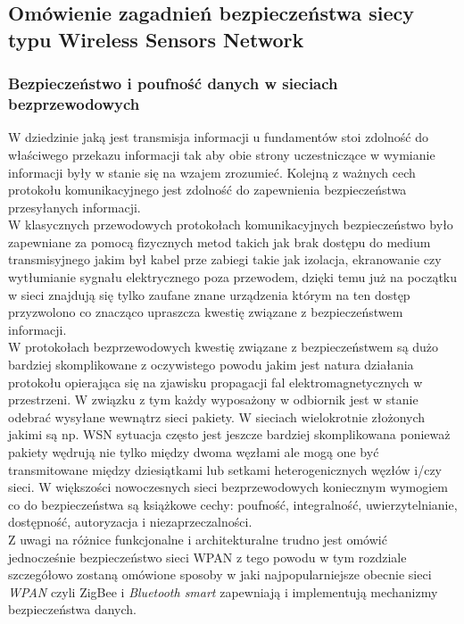 \subsection{Omówienie zagadnień bezpieczeństwa siecy typu Wireless Sensors Network}

\subsubsection{Bezpieczeństwo i poufność danych w sieciach bezprzewodowych}

\par
\tab W dziedzinie jaką jest transmisja informacji u fundamentów stoi zdolność do właściwego przekazu informacji tak aby obie strony uczestniczące w wymianie informacji były w stanie się na wzajem zrozumieć. Kolejną z ważnych cech protokołu komunikacyjnego jest zdolność do zapewnienia bezpieczeństwa przesyłanych informacji. \\
W klasycznych przewodowych protokołach komunikacyjnych bezpieczeństwo było zapewniane za pomocą fizycznych metod takich jak brak dostępu do medium transmisyjnego jakim był kabel prze zabiegi takie jak izolacja, ekranowanie czy wytłumianie sygnału elektrycznego poza przewodem, dzięki temu już na początku w sieci znajdują się tylko zaufane znane urządzenia którym na ten dostęp przyzwolono co znacząco upraszcza kwestię związane z bezpieczeństwem informacji. \\
\tab W protokołach bezprzewodowych kwestię związane z bezpieczeństwem są dużo bardziej skomplikowane z oczywistego powodu jakim jest natura działania protokołu opierająca się na zjawisku propagacji fal elektromagnetycznych w przestrzeni. W związku z tym każdy wyposażony w odbiornik jest w stanie odebrać wysyłane wewnątrz sieci pakiety. W sieciach wielokrotnie złożonych jakimi są np. WSN sytuacja często jest jeszcze bardziej skomplikowana ponieważ pakiety wędrują nie tylko między dwoma węzłami ale mogą one być transmitowane między dziesiątkami lub setkami heterogenicznych węzłów i/czy sieci.  
W większości nowoczesnych sieci bezprzewodowych koniecznym wymogiem co do bezpieczeństwa są książkowe cechy: poufność, integralność, uwierzytelnianie, dostępność, autoryzacja i niezaprzeczalności.  \\
Z uwagi na różnice funkcjonalne i architekturalne trudno jest omówić jednocześnie bezpieczeństwo sieci WPAN z tego powodu w tym rozdziale szczegółowo zostaną omówione sposoby w jaki najpopularniejsze obecnie sieci \textit{WPAN} czyli ZigBee i \textit{Bluetooth smart} zapewniają i implementują mechanizmy bezpieczeństwa danych. \\

